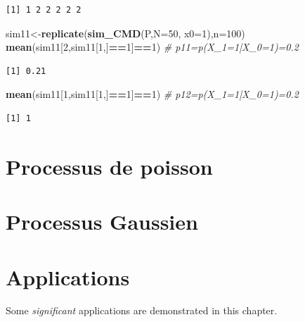 \documentclass[
]{book}
\newenvironment{Shaded}{\begin{snugshade}}{\end{snugshade}}
\newcommand{\CommentTok}[1]{\textcolor[rgb]{0.56,0.35,0.01}{\textit{#1}}}
\newcommand{\DataTypeTok}[1]{\textcolor[rgb]{0.13,0.29,0.53}{#1}}
\newcommand{\DecValTok}[1]{\textcolor[rgb]{0.00,0.00,0.81}{#1}}
\newcommand{\KeywordTok}[1]{\textcolor[rgb]{0.13,0.29,0.53}{\textbf{#1}}}
\newcommand{\NormalTok}[1]{#1}
\newcommand{\OperatorTok}[1]{\textcolor[rgb]{0.81,0.36,0.00}{\textbf{#1}}}
\theoremstyle{definition}
\theoremstyle{definition}
\theoremstyle{definition}
\theoremstyle{remark}
\begin{document}
\begin{verbatim}
[1] 1 2 2 2 2 2
\end{verbatim}

\begin{Shaded}
\begin{Highlighting}[]
\NormalTok{sim11<-}\KeywordTok{replicate}\NormalTok{(}\KeywordTok{sim_CMD}\NormalTok{(P,}\DataTypeTok{N=}\DecValTok{50}\NormalTok{, }\DataTypeTok{x0=}\DecValTok{1}\NormalTok{),}\DataTypeTok{n=}\DecValTok{100}\NormalTok{)}
\KeywordTok{mean}\NormalTok{(sim11[}\DecValTok{2}\NormalTok{,sim11[}\DecValTok{1}\NormalTok{,]}\OperatorTok{==}\DecValTok{1}\NormalTok{]}\OperatorTok{==}\DecValTok{1}\NormalTok{) }\CommentTok{# p11=p(X_1=1|X_0=1)=0.2}
\end{Highlighting}
\end{Shaded}

\begin{verbatim}
[1] 0.21
\end{verbatim}

\begin{Shaded}
\begin{Highlighting}[]
\KeywordTok{mean}\NormalTok{(sim11[}\DecValTok{1}\NormalTok{,sim11[}\DecValTok{1}\NormalTok{,]}\OperatorTok{==}\DecValTok{1}\NormalTok{]}\OperatorTok{==}\DecValTok{1}\NormalTok{) }\CommentTok{# p12=p(X_1=1|X_0=1)=0.2}
\end{Highlighting}
\end{Shaded}

\begin{verbatim}
[1] 1
\end{verbatim}

\hypertarget{processus-de-poisson}{%
\chapter{Processus de poisson}\label{processus-de-poisson}}

\hypertarget{processus-gaussien}{%
\chapter{Processus Gaussien}\label{processus-gaussien}}

\hypertarget{applications}{%
\chapter{Applications}\label{applications}}

Some \emph{significant} applications are demonstrated in this chapter.
\end{document}
